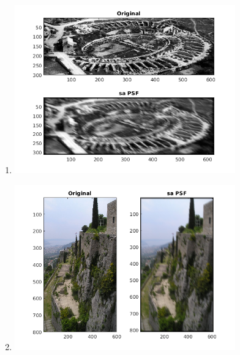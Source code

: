 \documentclass[12pt, a4]{report}
\begin{document}
\begin{enumerate}
\begin{minipage}{\linewidth}
	      \end{minipage}
	\item
	      \begin{minipage}{\linewidth}
		      \centering
		      \includegraphics[width=0.75\textwidth]{salonapsf}
	      \end{minipage}
	\item
	      \begin{minipage}{\linewidth}
		      \centering
		      \includegraphics[width=0.75\textwidth]{klispsf}
	      \end{minipage}
\end{enumerate}
\end{document}
